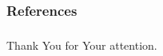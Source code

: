 \documentclass[10pt, xcolor=dvipsnames]{beamer} %
\begin{document}
\begin{frame}
\nocite{deal,mxfem,sgfem,gracie,dip}
  \scriptsize
  \frametitle{References}
  \renewcommand{\refname}{}
  
  
\end{frame}

\begin{frame}
  \frametitle{}
  
  
  \vspace{2cm}
  
  \centering
  Thank You for Your attention.
  
  
\end{frame}


%   
% 
\end{document}
